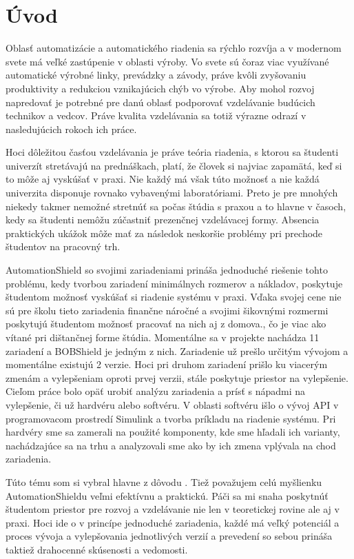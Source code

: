 \chapter*{Úvod}

Oblasť automatizácie a automatického riadenia sa rýchlo rozvíja a v modernom svete má veľké zastúpenie v oblasti výroby. Vo svete sú čoraz viac využívané automatické výrobné linky, prevádzky a závody, práve kvôli zvyšovaniu produktivity a redukciou vznikajúcich chýb vo výrobe. Aby mohol rozvoj napredovať je potrebné pre danú oblasť podporovať vzdelávanie budúcich technikov a vedcov. Práve kvalita vzdelávania sa totiž výrazne odrazí v nasledujúcich rokoch ich práce. 

Hoci dôležitou časťou vzdelávania je práve teória riadenia, s ktorou sa študenti univerzít stretávajú na prednáškach, platí, že človek si najviac zapamätá, keď si to môže aj vyskúšať v praxi.  Nie každý má však túto možnosť a nie každá univerzita disponuje rovnako vybavenými laboratóriami. Preto je pre mnohých niekedy takmer nemožné stretnúť sa počas štúdia s praxou a to hlavne v časoch, kedy sa študenti nemôžu  zúčastniť prezenčnej vzdelávacej formy. Absencia praktických ukážok môže mať za následok neskoršie problémy pri prechode študentov na pracovný trh. 

AutomationShield so svojimi zariadeniami prináša jednoduché riešenie tohto problému, kedy tvorbou zariadení minimálnych rozmerov a nákladov, poskytuje študentom možnosť vyskúšať si riadenie systému v praxi. Vďaka svojej cene nie sú pre školu tieto zariadenia finančne náročné a svojimi šikovnými rozmermi poskytujú študentom možnosť pracovať na nich aj z domova., čo je viac ako vítané pri dištančnej forme štúdia. Momentálne sa v projekte nachádza 11 zariadení a BOBShield je jedným z nich. Zariadenie už prešlo určitým vývojom a momentálne existujú 2 verzie. Hoci pri druhom zariadení prišlo ku viacerým zmenám a vylepšeniam oproti prvej verzii, stále poskytuje priestor na vylepšenie. Cieľom práce bolo opäť urobiť analýzu zariadenia a prísť s nápadmi na vylepšenie, či už hardvéru alebo softvéru. V oblasti softvéru išlo o vývoj API v programovacom prostredí Simulink a tvorba príkladu na riadenie systému. Pri hardvéry sme sa zamerali na použité komponenty, kde sme hľadali ich varianty, nachádzajúce sa na trhu a analyzovali sme ako by ich zmena vplývala na chod zariadenia.

Túto tému som si vybral hlavne z dôvodu   . Tiež považujem celú myšlienku AutomationShieldu veľmi efektívnu a praktickú. Páči sa mi snaha poskytnúť študentom priestor pre rozvoj a vzdelávanie nie len v teoretickej rovine ale aj v praxi. Hoci ide o v princípe jednoduché zariadenia, každé má veľký potenciál a proces vývoja a vylepšovania jednotlivých verzií a prevedení so sebou prináša taktiež drahocenné skúsenosti a vedomosti.      

